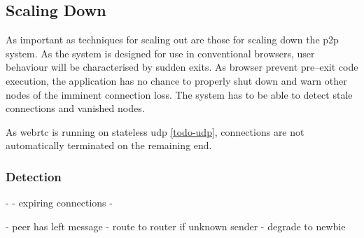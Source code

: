 \subsection{Scaling Down}
As important as techniques for scaling out are those for scaling down the \gls{p2p} system. As the system is designed for use in conventional browsers, user behaviour will be characterised by sudden exits. As browser prevent pre–exit code execution, the application has no chance to properly shut down and warn other nodes of the imminent connection loss. The system has to be able to detect stale connections and vanished nodes.

\begin{itemize}
    As \gls{webrtc} is running on stateless \gls{udp} \ref{todo-udp}, connections are not automatically terminated on the remaining end.
\end{itemize}
\subsubsection{Detection}
- 
- expiring connections
- 

- peer has left message
- route to router if unknown sender
- degrade to newbie
